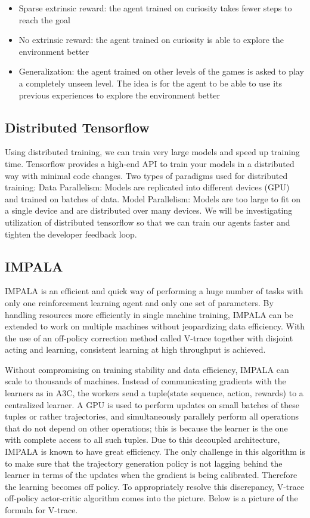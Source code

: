 \documentclass[conference]{IEEEtran}
\begin{document}
\begin{itemize}
\item Sparse extrinsic reward: the agent trained on curiosity takes fewer steps to reach the goal
\item No extrinsic reward: the agent trained on curiosity is able to explore the environment better
\item Generalization: the agent trained on other levels of the games is asked to play a completely unseen level.
The idea is for the agent to be able to use its previous experiences to explore the environment better
\end{itemize}

\subsection{\textbf{Distributed Tensorflow}}

Using distributed training, we can train very large models and speed up training time. Tensorflow provides a high-end API to train your models in a distributed way with minimal code changes.  Two types of paradigms used for distributed training:
Data Parallelism: Models are replicated into different devices (GPU) and trained on batches of data.
Model Parallelism: Models are too large to fit on a single device and are distributed over many devices.
We will be investigating utilization of distributed tensorflow so that we can train our agents faster and tighten the developer feedback loop.

\subsection{\textbf{IMPALA}}

IMPALA \cite{Espeholt-et-al} is an efficient and quick way of performing a huge number of tasks with only one reinforcement learning agent and only one set of parameters. By handling resources more efficiently in  single machine training, IMPALA can be extended to work on multiple machines without jeopardizing data efficiency. With the use of an off-policy correction method called V-trace together with disjoint acting and learning, consistent learning at high throughput is achieved.

Without compromising on training stability and data efficiency, IMPALA can scale to thousands of machines. Instead of communicating gradients with the learners as in A3C, the workers send a tuple(state sequence, action, rewards) to a centralized learner. A GPU is used to perform updates on small batches of these tuples or rather trajectories, and simultaneously parallely perform all operations that do not depend on other operations; this is because the learner is the one with complete access to all such tuples. Due to this decoupled architecture, IMPALA is known to have great efficiency. The only challenge in this algorithm is to make sure that the trajectory generation policy is not lagging behind the learner in terms of the updates when the gradient is being calibrated. Therefore the learning becomes off policy. To appropriately resolve this discrepancy,  V-trace off-policy actor-critic algorithm comes into the picture. Below is a picture of the formula for V-trace.
\end{document}
